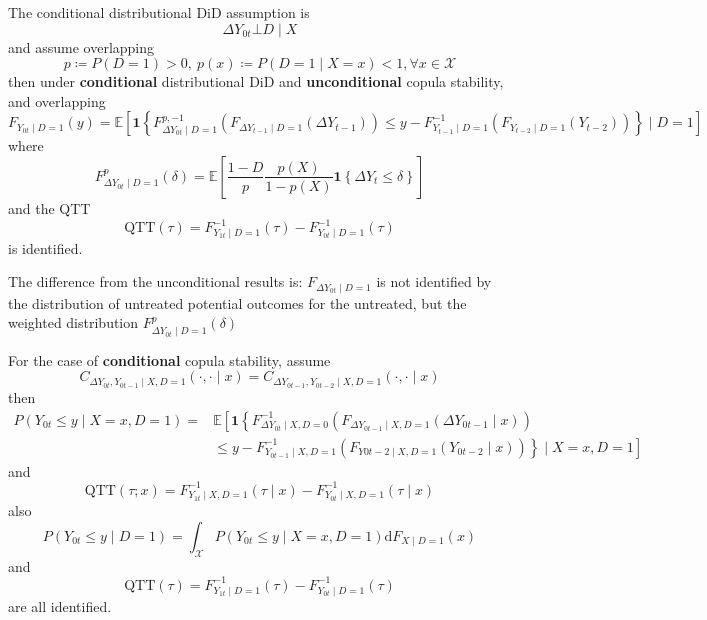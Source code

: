 \documentclass[twoside]{article}
\begin{document}
The conditional distributional DiD assumption is $$ \Delta Y_{0t} \bot D\mid X $$
and assume overlapping 
$$
p \coloneq P(D=1)>0,\ p(x)\coloneq P(D=1\mid X=x)<1,\forall x\in \mathcal{X}
$$
then under \textbf{conditional} distributional DiD and \textbf{unconditional} copula stability, and overlapping
\begin{equation*}
    F_{Y_{0t}\mid D=1}(y) = \mathbb{E} \left[ \mathbf{1} \left\{ F^{p,-1}_{\Delta Y_{0t}\mid D=1}\left(F_{\Delta Y_{t-1}\mid D=1}(\Delta Y_{t-1})\right) \leq y-F^{-1}_{Y_{t-1}\mid D=1}\left( F_{Y_{t-2}\mid D=1}(Y_{t-2}) \right) \right\} \mid D=1 \right]
\end{equation*}
where 
$$ F^p_{\Delta Y_{0t}\mid D=1}(\delta) = \mathbb{E}\left[ \frac{1-D}{p}\frac{p(X)}{1-p(X)} \mathbf{1}\left\{\Delta Y_t\leq \delta\right\} \right] $$
and the QTT $$ \mathrm{QTT}(\tau) = F^{-1}_{Y_{1t}\mid D=1}(\tau) - F^{-1}_{Y_{0t}\mid D=1}(\tau) $$
is identified.

The difference from the unconditional results is: $F_{\Delta Y_{0t}\mid D=1}$ is not identified by the distribution of untreated potential outcomes for the untreated, but the weighted distribution $F^p_{\Delta Y_{0t}\mid D=1}(\delta)$

For the case of \textbf{conditional} copula stability, assume 
\begin{equation*}
    C_{\Delta Y_{0t},Y_{0t-1}\mid X,D=1}\left(\cdot,\cdot \mid x\right) = C_{\Delta Y_{0t-1},Y_{0t-2}\mid X,D=1}\left(\cdot,\cdot \mid x\right)
\end{equation*}
then 
\begin{align*}
    P \left( Y_{0t}\leq y \mid X=x,D=1 \right) =& \mathbb{E} \left[ \mathbf{1} \left\{F^{-1}_{\Delta Y_{0t}\mid X,D=0} \left(F_{\Delta Y_{0t-1}\mid X,D=1} \left(\Delta Y_{0t-1}\mid x\right)\right)\right. \right.\\
    & \left.\left.\leq y-F^{-1}_{Y_{0t-1}\mid X,D=1}\left( F_{Y0t-2\mid X,D=1} (Y_{0t-2}\mid x) \right)\right\} \mid X=x,D=1 \right]
\end{align*}
and $$ \mathrm{QTT}\left(\tau;x\right) = F^{-1}_{Y_{1t}\mid X,D=1}(\tau\mid x) - F^{-1}_{Y_{0t}\mid X,D=1}(\tau\mid x) $$
also 
\begin{equation*}
    P\left(Y_{0t}\leq y \mid D=1 \right) = \int_{\mathcal{X}} P\left(Y_{0t}\leq y \mid X=x,D=1\right)\mathrm{d}F_{X\mid D=1}(x)
\end{equation*}
and $$ \mathrm{QTT}(\tau) = F^{-1}_{Y_{1t}\mid D=1}(\tau) - F^{-1}_{Y_{0t}\mid D=1}(\tau) $$
are all identified.
\end{document}
